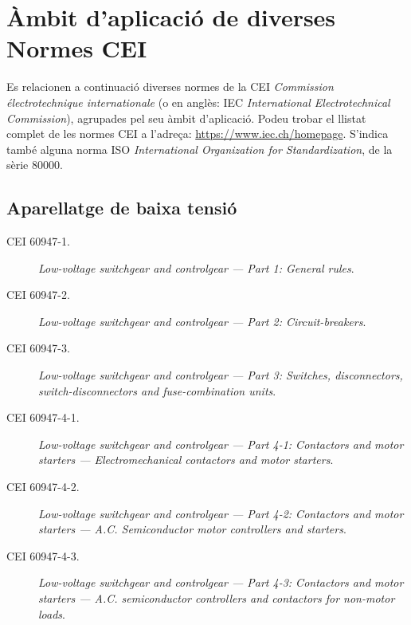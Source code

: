 \section{Àmbit d'aplicació de diverses Normes CEI}\label{sec:normes_IEC}

Es relacionen a continuació diverses normes de la CEI \textit{Commission électrotechnique internationale} (o en anglès: IEC \textit{International Electrotechnical Commission}), agrupades pel seu àmbit d'aplicació. Podeu trobar el llistat complet de les normes CEI a l'adreça: \href{https://www.iec.ch/homepage}{https:/\!\!/www.iec.ch/homepage}. S'indica també alguna norma ISO \textit{International Organization for Standardization}, de la sèrie 80000.

\subsection*{Aparellatge de baixa tensió}
\begin{description}
	
	\item [\hspace{5mm}CEI 60947-1.] \textit{Low-voltage switchgear and controlgear --- Part 1: General rules}.
	\item [\hspace{5mm}CEI 60947-2.] \textit{Low-voltage switchgear and controlgear --- Part 2: Circuit-breakers}.
	\item [\hspace{5mm}CEI 60947-3.] \textit{Low-voltage switchgear and controlgear --- Part 3: Switches, disconnectors, switch-dis\-con\-nec\-tors and fuse-combination units}.
	\item [\hspace{5mm}CEI 60947-4-1.] \textit{Low-voltage switchgear and controlgear --- Part 4-1: Contactors and motor starters ---  Electromechanical contactors and motor starters}.
	\item [\hspace{5mm}CEI 60947-4-2.] \textit{Low-voltage switchgear and controlgear --- Part 4-2: Contactors and motor starters ---  A.C. Semiconductor motor controllers and starters}.
	\item [\hspace{5mm}CEI 60947-4-3.] \textit{Low-voltage switchgear and controlgear --- Part 4-3: Contactors and motor starters ---  A.C. semiconductor controllers and contactors for non-motor loads}.
\end{description}




